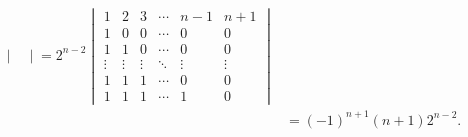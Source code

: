 \documentclass[12pt,fontset=fandol]{ctexart}
\begin{document}
\begin{solve}
\begin{align*}
\begin{vmatrix}
               \end{vmatrix}=2^{n-2}
        \begin{vmatrix}
            1      & 2      & 3      & \cdots & n-1    & n+1    \\
            1      & 0      & 0      & \cdots & 0      & 0      \\
            1      & 1      & 0      & \cdots & 0      & 0      \\
            \vdots & \vdots & \vdots & \ddots & \vdots & \vdots \\
            1      & 1      & 1      & \cdots & 0      & 0      \\
            1      & 1      & 1      & \cdots & 1      & 0
        \end{vmatrix}                      \\
            & =(-1)^{n+1}(n+1) 2^{n-2}.
    \end{align*}
\end{solve}
\end{document}
